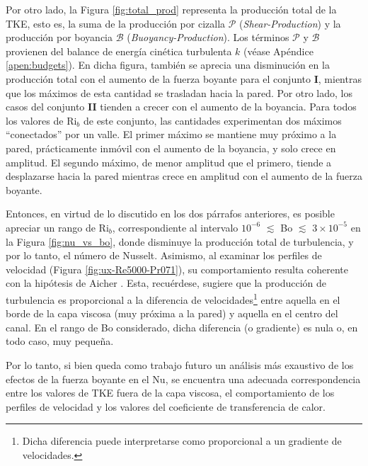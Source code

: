Por otro lado, la Figura \ref{fig:total_prod} representa la producción total de la TKE, esto es, la suma de la producción por cizalla $\mathcal{P}$ (\textit{Shear-Production}) y la producción por boyancia $\mathcal{B}$ (\textit{Buoyancy-Production}). Los términos $\mathcal{P}$ y $\mathcal{B}$ provienen del balance de energía cinética turbulenta $k$  (véase Apéndice \ref{apen:budgets}). En dicha figura, también se aprecia una disminución en la producción total con el aumento de la fuerza boyante para el conjunto \textbf{I}, mientras que los máximos de esta cantidad se trasladan hacia la pared. Por otro lado, los casos del conjunto \textbf{II} tienden a crecer con el aumento de la boyancia. Para todos los valores de $\text{Ri}_b$ de este conjunto, las cantidades experimentan dos máximos ``conectados'' por un valle. El primer máximo se mantiene muy próximo a la pared, prácticamente inmóvil con el aumento de la boyancia, y solo crece en amplitud. El segundo máximo, de menor amplitud que el primero, tiende a desplazarse hacia la pared mientras crece en amplitud con el aumento de la fuerza boyante.

Entonces, en virtud de lo discutido en los dos párrafos anteriores, es posible apreciar un rango de Ri$_b$, correspondiente al intervalo $10^{-6}$ $\lesssim$ Bo $\lesssim$ $3 \times 10^{-5}$ en la Figura \ref{fig:nu_vs_bo}, donde disminuye la producción total de turbulencia, y por lo tanto, el número de Nusselt. Asimismo, al examinar los perfiles de velocidad (Figura \ref{fig:ux-Re5000-Pr071}), su comportamiento resulta coherente con la hipótesis de Aicher \cite{aicher1997}. Esta, recuérdese, sugiere que la producción de turbulencia es proporcional a la diferencia de velocidades\footnote{Dicha diferencia puede interpretarse como proporcional a un gradiente de velocidades.} entre aquella en el borde de la capa viscosa (muy próxima a la pared) y aquella en el centro del canal. En el rango de Bo considerado, dicha diferencia (o gradiente) es nula o, en todo caso, muy pequeña.

Por lo tanto, si bien queda como trabajo futuro un análisis más exaustivo de los efectos de la fuerza boyante en el Nu, se encuentra una adecuada correspondencia entre los valores de TKE fuera de la capa viscosa, el comportamiento de los perfiles de velocidad y los valores del coeficiente de transferencia de calor.



